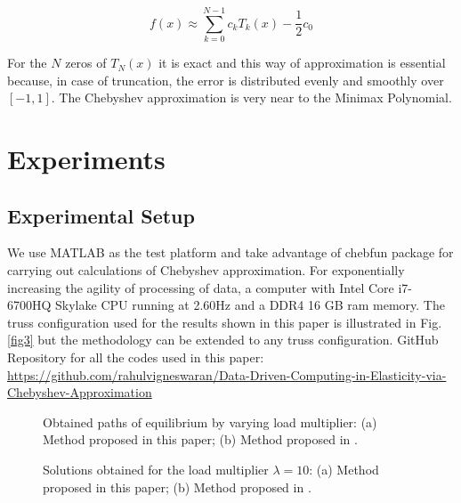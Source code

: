 \documentclass[conference]{IEEEtran}
\begin{document}
\[f\left( x \right)\approx \sum\limits_{k=0}^{N-1}{{{c}_{k}}{{T}_{k}}\left( x \right)}-\frac{1}{2}{{c}_{0}}\tag{2}\label{tag2}\]

For the $N$ zeros of ${T_N}\left( x \right)$ it is exact and this way of approximation is essential because, in case of truncation, the error is distributed evenly and smoothly over $\left[ { - 1,1} \right]$. The Chebyshev approximation \cite{23,30} is very near to the Minimax Polynomial. 

\section{Experiments}
\label{experiments}
\subsection{Experimental Setup}
We use MATLAB as the test platform and take advantage of chebfun \cite{27} package for carrying out calculations of Chebyshev approximation. For exponentially increasing the agility of processing of data, a computer with Intel Core i7-6700HQ Skylake CPU running at 2.60Hz and a DDR4 16 GB ram memory. The truss configuration used for the results shown in this paper is illustrated in Fig. \ref{fig3} but the methodology can be extended to any truss configuration. GitHub Repository for all the codes used in this paper:  \href{https://github.com/rahulvigneswaran/Data-Driven-Computing-in-Elasticity-via-Chebyshev-Polynomial}{https://github.com/rahulvigneswaran/Data-Driven-Computing-in-Elasticity-via-Chebyshev-Approximation}

\begin{figure*}[hb]
\centering
{}
\caption{Obtained paths of equilibrium by varying load multiplier: (a) Method proposed in this paper; (b) Method proposed in \cite{26}.}
\label{fig5}
\end{figure*}

\begin{figure*}[hb]
\centering
{}
\caption{Solutions obtained for the load multiplier $\lambda = 10$: (a) Method proposed in this paper; (b) Method proposed in \cite{26}.}
\label{fig6}
\end{figure*}
\end{document}

